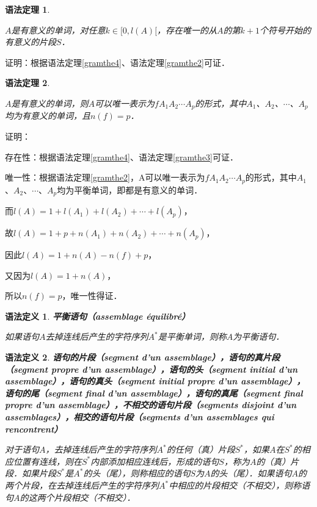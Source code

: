 \documentclass[12pt, a4paper, oneside]{book}
\newtheorem{gramdef}{语法定义}
\newtheorem{gramthe}{语法定理}
\begin{document}
			\begin{gramthe}\label{gramthe5}
				\hfill\par
				$A$是有意义的单词，对任意$k\in [0, l(A)[$，存在唯一的从$A$的第$k+1$个符号开始的有意义的片段$S$．	
			\end{gramthe}			
			证明：根据语法定理\ref{gramthe4}、语法定理\ref{gramthe2}可证．
						
			\begin{gramthe}\label{gramthe6}
				\hfill\par			
				$A$是有意义的单词，则$A$可以唯一表示为$fA_1A_2\cdots A_p$的形式，其中$A_1$、$A_2$、$\cdots$、$A_p$均为有意义的单词，且$n(f)=p$．
			\end{gramthe}			
			证明：
			\par
			存在性：根据语法定理\ref{gramthe4}、语法定理\ref{gramthe3}可证．
			\par
			唯一性：根据语法定理\ref{gramthe2}，A可以唯一表示为$fA_1A_2\cdots A_p$的形式，其中$A_1$、$A_2$、$\cdots$、$A_p$均为平衡单词，即都是有意义的单词．
			\par
			而$l(A)=1+l(A_1)+l(A_2)+\cdots+l(A_p)$，
			\par
			故$l(A)=1+p+n(A_1)+n(A_2)+\cdots+n(A_p)$，
			\par
			因此$l(A)=1+n(A)-n(f)+p$，
			\par
			又因为$l(A)=1+n(A)$，
			\par
			所以$n(f)=p$，唯一性得证．

			\begin{gramdef}
				\textbf{平衡语句（assemblage équilibré）}
				\par
				如果语句$A$去掉连线后产生的字符序列$A^*$是平衡单词，则称$A$为平衡语句．
			\end{gramdef}
			
			\begin{gramdef}
				\textbf{语句的片段（segment d'un assemblage），语句的真片段（segment propre d'un assemblage），语句的头（segment initial d'un assemblage），语句的真头（segment initial propre d'un assemblage），语句的尾（segment final d'un assemblage），语句的真尾（segment final propre d'un assemblage），不相交的语句片段（segments disjoint d'un assemblages），相交的语句片段（segments d'un assemblages qui rencontrent）}
				\par
				对于语句$A$，去掉连线后产生的字符序列$A^*$的任何（真）片段$S^*$，如果$A$在$S^*$的相应位置有连线，则在$S^*$内部添加相应连线后，形成的语句$S$，称为$A$的（真）片段．如果片段$S^*$是$A^*$的头（尾），则称相应的语句$S$为$A$的头（尾）．如果语句$A$的两个片段，在去掉连线后产生的字符序列$A^*$中相应的片段相交（不相交），则称语句$A$的这两个片段相交（不相交）．				
			\end{gramdef}
			
\end{document}
